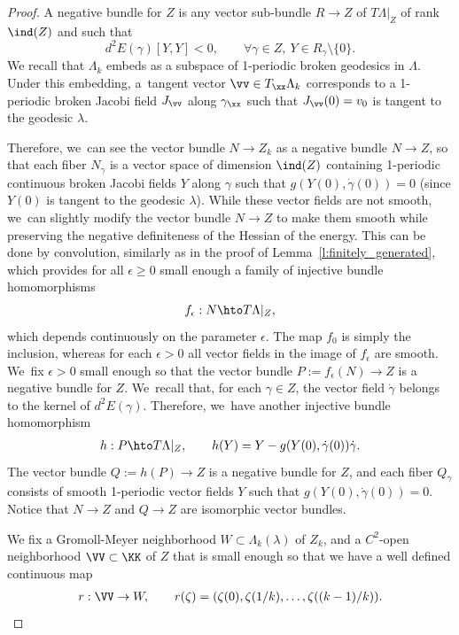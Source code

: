 \begin{proof}
A negative bundle for $Z$ is any vector sub-bundle $R\to Z$ of $T\Lambda|_Z$ of rank $\ind(Z)$ and such that
\[
d^2E(\gamma)[Y,Y]<0,\qquad\forall \gamma\in Z,\ Y\in R_\gamma\setminus\{0\}.
\]
We recall that $\Lambda_k$ embeds as a subspace of 1-periodic broken geodesics in $\Lambda$. Under this embedding, a~tangent vector $\vv\in T_{\xx}\Lambda_k$ corresponds to a 1-periodic broken Jacobi field $J_{\vv}$ along $\gamma_{\xx}$ such that $J_{\vv}(0)=v_0$ is tangent to the geodesic $\lambda$.

Therefore, we~can see the vector bundle $N\to Z_k$ as a negative bundle $N\to Z$, so that each fiber $N_{\gamma}$ is a vector space of dimension $\ind(Z)$ containing 1-periodic continuous broken Jacobi fields $Y$ along $\gamma$ such that $g(Y(0),\dot\gamma(0))=0$ (since $Y(0)$ is tangent to the geodesic $\lambda$).
While these vector fields are not smooth, we~can slightly modify the vector bundle $N\to Z$ to make them smooth while preserving the negative definiteness of the Hessian of the energy. This can be done by convolution, similarly as in the proof of Lemma~\ref{l:finitely_generated}, which provides for all $\epsilon\geq0$ small enough a family of injective bundle homomorphisms
\begin{align*}
f_\epsilon:N\hto T\Lambda|_{Z},
\end{align*}
which depends continuously on the parameter $\epsilon$. The map $f_0$ is simply the inclusion, whereas for each $\epsilon>0$ all vector fields in the image of $f_\epsilon$ are smooth. We~fix $\epsilon>0$ small enough so that the vector bundle $P:=f_\epsilon(N)\to Z$ is a negative bundle for $Z$. We~recall that, for each $\gamma\in Z$, the vector field $\dot\gamma$ belongs to the kernel of $d^2E(\gamma)$. Therefore, we~have another injective bundle homomorphism
\begin{align*}
h:P\hto T\Lambda|_Z,\qquad h(Y)=Y-g(Y(0),\dot\gamma(0))\dot\gamma.
\end{align*}
The vector bundle $Q:=h(P)\to Z$ is a negative bundle for $Z$, and each fiber $Q_\gamma$ consists of smooth 1-periodic vector fields $Y$ such that $g(Y(0),\dot\gamma(0))=0$. Notice that $N\to Z$ and $Q\to Z$ are isomorphic vector bundles.

We fix a Gromoll-Meyer neighborhood $W\subset\Lambda_k(\lambda)$ of $Z_k$, and a $C^2$-open neighborhood $\VV\subset\KK$ of $Z$ that is small enough so that we have a well defined continuous map
\begin{align*}
r:\VV\to W,\qquad r(\zeta)=(\zeta(0),\zeta(1/k),\dots,\zeta((k-1)/k)).
\end{align*}


\end{proof}
